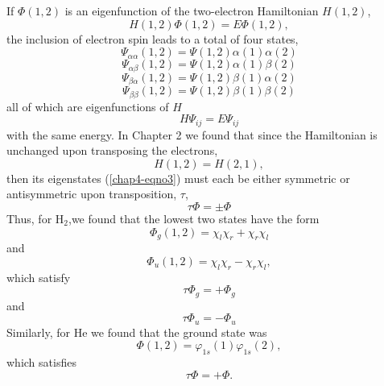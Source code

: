 If $\Phi(1,2)$ is an eigenfunction of the two-electron Hamiltonian 
$H(1,2)$,
\begin{equation}
H(1,2) \Phi(1,2) = E \Phi(1,2) ,
\label{chap4-eqno3}
\end{equation}
the inclusion of electron spin leads to a total of four states,
\begin{equation}
\Psi_{\alpha \alpha} (1,2) = \Psi(1,2) \alpha ( 1 ) \alpha ( 2 )
\end{equation}
\begin{equation}
\Psi_{\alpha \beta} ( 1 , 2 ) = \Psi ( 1 , 2 ) \alpha ( 1 ) \beta ( 2 )
\end{equation}
\begin{equation}
\Psi_{\beta \alpha} ( 1 , 2 ) = \Psi ( 1 , 2 ) \beta ( 1 ) \alpha ( 2 )
\end{equation}
\begin{equation}
\Psi_{\beta\beta} ( 1 , 2 ) = \Psi ( 1 , 2 ) \beta ( 1 ) \beta ( 2 )
\end{equation}
all of which are eigenfunctions of $H$
\begin{equation}
H \Psi_{ij} = E \Psi_{ij} 
\label{chap4-eqno4}
\end{equation}
with the same energy. In Chapter 2 we found that since the Hamiltonian is
unchanged upon transposing the electrons,
\begin{equation}
H (1 , 2) = H ( 2 , 1),
\end{equation}
then its eigenstates (\ref{chap4-eqno3}) must each be either symmetric
or antisymmetric upon transposition, $\tau$,
\begin{equation}
\tau \Phi = \pm \Phi
\label{chap4-eqno5}
\end{equation}
Thus, for H$_2$,we found that the lowest two states have the form
\begin{equation}
\Phi_g ( 1 , 2 ) = \chi_l \chi_r + \chi_r \chi_l
\end{equation}
and
\begin{equation}
\Phi_u ( 1 , 2 ) = \chi_l \chi_r - \chi_r \chi_l ,
\end{equation}
which satisfy
\begin{equation}
\tau \Phi_g = + \Phi_g
\end{equation}
and
\begin{equation}
\tau \Phi_u = - \Phi_u
\end{equation}
Similarly, for He we found that the ground state was
\begin{equation}
\Phi ( 1 , 2 ) = \varphi_{1s} (1) \varphi_{1s} (2) ,
\end{equation}
which satisfies
\begin{equation}
\tau \Phi = + \Phi .
\end{equation}  

